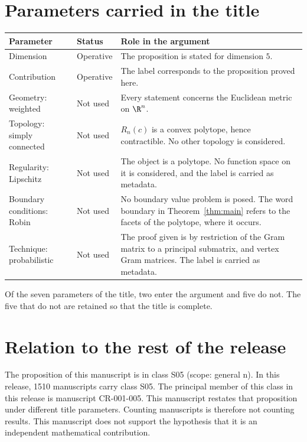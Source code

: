 \documentclass[11pt]{article}
\begin{document}
\section{Parameters carried in the title}\label{sec:params}
\begin{center}
\small
\begin{tabular}{p{}p{}p{}}
\toprule
Parameter & Status & Role in the argument \\
\midrule
Dimension & Operative & The proposition is stated for dimension $5$. \\
Contribution & Operative & The label corresponds to the proposition proved here. \\
Geometry: weighted & Not used & Every statement concerns the Euclidean metric on $\R^n$. \\
Topology: simply connected & Not used & $R_n(c)$ is a convex polytope, hence contractible. No other topology is considered. \\
Regularity: Lipschitz & Not used & The object is a polytope. No function space on it is considered, and the label is carried as metadata. \\
Boundary conditions: Robin & Not used & No boundary value problem is posed. The word boundary in Theorem~\ref{thm:main} refers to the facets of the polytope, where it occurs. \\
Technique: probabilistic & Not used & The proof given is by restriction of the Gram matrix to a principal submatrix, and vertex Gram matrices. The label is carried as metadata. \\
\bottomrule
\end{tabular}
\end{center}
Of the seven parameters of the title, two enter the argument and five do not. The five that do not are retained so that the title is complete.

\section{Relation to the rest of the release}
The proposition of this manuscript is in class S05 (scope: general n).
In this release, 1510 manuscripts carry class S05. The principal member of this class in this release is manuscript CR-001-005. This manuscript restates that proposition under different title parameters.
Counting manuscripts is therefore not counting results. This manuscript does not support the hypothesis that it is an independent mathematical contribution.
\end{document}
